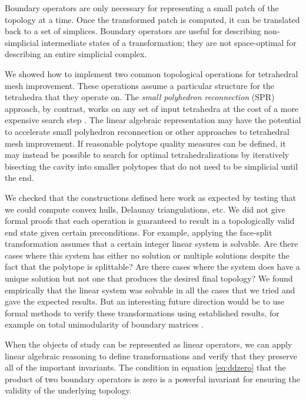 \documentclass[twocolumn]{article}
\begin{document}
Boundary operators are only necessary for representing a small patch of the topology at a time.
Once the transformed patch is computed, it can be translated back to a set of simplices.
Boundary operators are useful for describing non-simplicial intermediate states of a transformation; they are not space-optimal for describing an entire simplicial complex.

We showed how to implement two common topological operations for tetrahedral mesh improvement.
These operations assume a particular structure for the tetrahedra that they operate on.
The \emph{small polyhedron reconnection} (SPR) approach, by contrast, works on any set of input tetrahedra at the cost of a more expensive search step \cite{marot2020reviving}.
The linear algebraic representation may have the potential to accelerate small polyhedron reconnection or other approaches to tetrahedral mesh improvement.
If reasonable polytope quality measures can be defined, it may instead be possible to search for optimal tetrahedralizations by iteratively bisecting the cavity into smaller polytopes that do not need to be simplicial until the end.

We checked that the constructions defined here work as expected by testing that we could compute convex hulls, Delaunay triangulations, etc.
We did not give formal proofs that each operation is guaranteed to result in a topologically valid end state given certain preconditions.
For example, applying the face-split transformation assumes that a certain integer linear system is solvable.
Are there cases where this system has either no solution or multiple solutions despite the fact that the polytope is splittable?
Are there cases where the system does have a unique solution but not one that produces the desired final topology?
We found empirically that the linear system was solvable in all the cases that we tried and gave the expected results.
But an interesting future direction would be to use formal methods to verify these transformations using established results, for example on total unimodularity of boundary matrices \cite{dey2010optimal}.

When the objects of study can be represented as linear operators, we can apply linear algebraic reasoning to define transformations and verify that they preserve all of the important invariants.
The condition in equation \eqref{eq:ddzero} that the product of two boundary operators is zero is a powerful invariant for ensuring the validity of the underlying topology.



\end{document}
